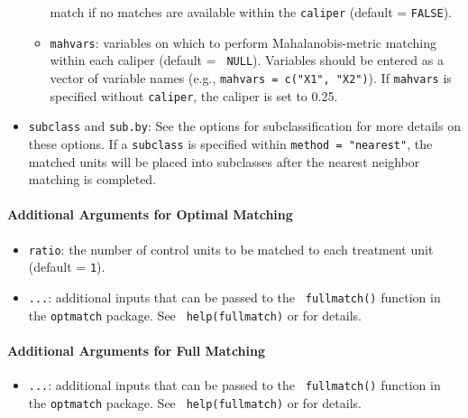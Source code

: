 \begin{itemize}
\begin{itemize}
    match if no matches are available within the \texttt{caliper}
    (default = {\tt FALSE}).
  \item \texttt{mahvars}: variables on which to perform
    Mahalanobis-metric matching within each caliper (default = {\tt
      NULL}).  Variables should be entered as a vector of variable
    names (e.g., \texttt{mahvars = c("X1", "X2")}).  If
    \texttt{mahvars} is specified without \texttt{caliper}, the
    caliper is set to 0.25.
  \end{itemize}
\item \texttt{subclass} and \texttt{sub.by}: See the options for
  subclassification for more details on these options.  If a
  \texttt{subclass} is specified within \texttt{method = "nearest"},
  the matched units will be placed into subclasses after the nearest
  neighbor matching is completed.
\end{itemize}

\paragraph{Additional Arguments for Optimal Matching}
\label{subsubsec:inputs-optimal}

\begin{itemize}
\item {\tt ratio}: the number of control units to be matched to each
  treatment unit (default = {\tt 1}).
\item {\tt ...}: additional inputs that can be passed to the {\tt
    fullmatch()} function in the {\tt optmatch} package. See {\tt
    help(fullmatch)} or
  for details.
\end{itemize}

\paragraph{Additional Arguments for Full Matching}
\label{subsubsec:inputs-full}

\begin{itemize}
\item {\tt ...}: additional inputs that can be passed to the {\tt
    fullmatch()} function in the {\tt optmatch} package. See {\tt
    help(fullmatch)} or
   for details.
\end{itemize}

